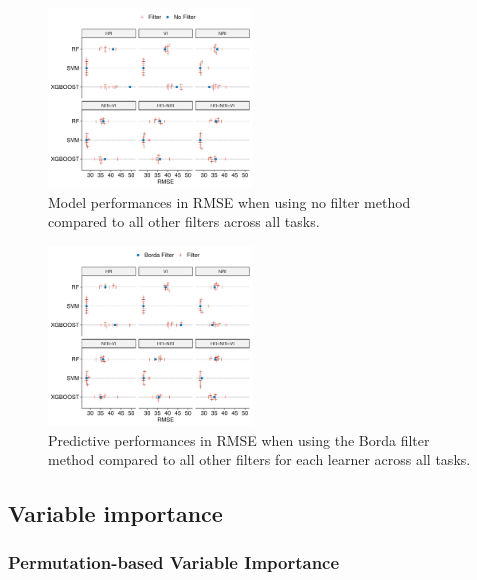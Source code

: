 \documentclass[letterpaper, peerreview]{IEEEtran}
\begin{document}
\begin{figure} [t!]
	\centering
	\begin{center}
		\includegraphics[width=0.48\textwidth] {filter-effect-all-vs-no-filter-1.pdf}
		\caption{Model performances in RMSE when using no filter method compared to all other filters across all tasks.}\label{fig:filter-effects-no-filter}
	\end{center}
\end{figure}

\begin{figure} [t!]
	\centering
	\begin{center}
		\includegraphics[width=0.48\textwidth] {filter-effect-all-vs-borda-filter-1.pdf}
		\caption{Predictive performances in RMSE when using the Borda filter method compared to all other filters for each learner across all tasks.}\label{fig:filter-effects-borda}
	\end{center}
\end{figure}

\subsection{Variable importance}

\subsubsection{Permutation-based Variable Importance}
\end{document}
